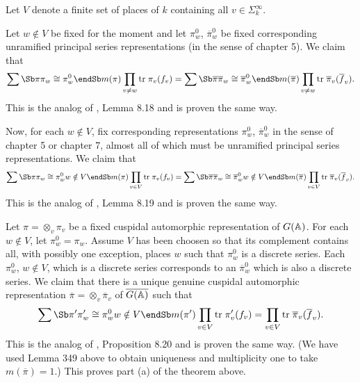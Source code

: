 Let $V$ denote a finite set of places of $k$ containing all
$v\in \Sigma^\infty_k$.

Let $w\notin V$ be fixed for the moment and let $\pi _w^0$,
$\overline{\pi }_w^0$ be fixed corresponding
unramified principal series representations (in
the sense of chapter 5).
We claim that
\[
\sum\Sb \pi  \\ \pi _w\cong \pi _w^0 \endSb m(\pi )
\prod_{v\neq w}{\rm tr}\;
\pi _v(f_v)=\sum\Sb \overline{\pi } \\
\overline{\pi }_w\cong \overline{\pi }_w^0 \endSb
m(\overline{\pi })\prod_{v\neq w}{\rm tr}\;
\overline{\pi }_v(\overline{f}_v).
\]
This is the analog of \cite{GJ}, Lemma 8.18 and is proven the same way.

Now, for each $w\notin V$, fix corresponding representations
$\pi _w^0$, $\overline{\pi }_w^0$ in the sense of chapter 5 or chapter 7,
almost all of which
must be unramified principal series representations.
We claim that
\[
\sum\Sb \pi  \\ \pi _w\cong \pi _w^0 \\ w\notin V \endSb m(\pi )\prod_{v\in
V}{\rm tr}\;\pi _v(f_v)=\sum\Sb \overline{\pi } \\ \overline{\pi }_w\cong 
\overline{\pi }_w^0 \\ w\notin V \endSb
m(\overline{\pi })\prod_{v\in V}{\rm tr}\;
\overline{\pi }_v(\overline{f}_v).
\]
This is the analog of \cite{GJ}, Lemma 8.19 and is proven the same way.

Let $\pi =\otimes _v\pi _v$ be a fixed cuspidal automorphic representation
of $G({\Bbb A})$. For each $w\notin V$, let $\pi _w^0=\pi _w$.
Assume $V$ has been choosen so that its complement
contains all, with possibly one exception, places $w$ such that
$\pi_w^0$ is a discrete series. Each $\pi_w^0$, $w\notin V$,
which is a discrete series corresponds to an
$\overline{\pi}_w^0$ which is also a discrete series.
We claim that
there is a unique genuine cuspidal automorphic representation $\overline{\pi 
}=\otimes _v\overline{\pi }_v$ of $\overline{G({\Bbb A})}$ such that 
\begin{equation}
\sum\Sb \pi ^{\prime } \\ \pi _w^{\prime }\cong \pi _w^0 \\ w\notin V \endSb %
m(\pi ^{\prime })\prod_{v\in V}{\rm tr}\;\pi _v^{\prime }(f_v)=\prod_{v\in V}%
{\rm tr}\;\overline{\pi }_v(\overline{f}_v).
\end{equation}
This is the analog of \cite{GJ}, Proposition 8.20
and is proven the same way. (We have used Lemma 349
above to obtain uniqueness and multiplicity one to
take $m(\overline{\pi })=1$.) This proves part (a) of the theorem above.

